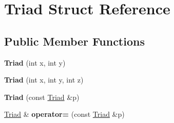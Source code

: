\hypertarget{structTriad}{}\section{Triad Struct Reference}
\label{structTriad}
\subsection*{Public Member Functions}
\begin{DoxyCompactItemize}
\item 
{\bfseries Triad} (int x, int y)\hypertarget{structTriad_aa8710a322efe52fc51e8e26d2a6ab560}{}\label{structTriad_aa8710a322efe52fc51e8e26d2a6ab560}

\item 
{\bfseries Triad} (int x, int y, int z)\hypertarget{structTriad_ac24e0580c82a3e32827af7c854acf9ba}{}\label{structTriad_ac24e0580c82a3e32827af7c854acf9ba}

\item 
{\bfseries Triad} (const \hyperlink{structTriad}{Triad} \&p)\hypertarget{structTriad_af3fb03efb8ea332c292450d858a33b53}{}\label{structTriad_af3fb03efb8ea332c292450d858a33b53}

\item 
\hyperlink{structTriad}{Triad} \& {\bfseries operator=} (const \hyperlink{structTriad}{Triad} \&p)\hypertarget{structTriad_a518cc8e29c2565032d9207edfa99be4d}{}\label{structTriad_a518cc8e29c2565032d9207edfa99be4d}

\end{DoxyCompactItemize}
